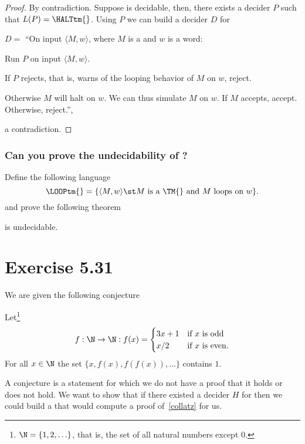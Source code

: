 \begin{proof}
By contradiction. Suppose \HALTtm{} is decidable, then,
there exists a decider \(P\) such that \(L(P) =
\text{\HALTtm{}} \). Using \(P\) we
can build a decider \(D\) for \Atm{}

\begin{TMachine}{\(D =\) ``On input \(\langle M,w \rangle\), where \(M\) is a \TM{} and \(w\) is
a word:}
	\item Run \(P\) on input \(\langle M,w \rangle\).
	\item If \(P\) rejects, that is, warns of the looping behavior of \(M\) on
		\(w\), reject.
	\item Otherwise \(M\) will halt on \(w\). We can thus simulate \(M\) on
		\(w\). If \(M\) accepts, accept. Otherwise, reject.'',
\end{TMachine}
a contradiction.
\end{proof}

\subsubsection{Can you prove the undecidability of \LOOPtm{}?}

Define the following language
\begin{displaymath}
\text{\LOOPtm{}} = \{ \langle M,w \rangle \st \text{\(M\) is a \TM{} and \(M\)
loops on \(w\)} \}.
\end{displaymath}
and prove the following theorem
\begin{theorem}\label{LOOPtm}
\LOOPtm{} is undecidable.
\end{theorem}


\section{Exercise 5.31}
We are given the following conjecture
\begin{conjecture}\label{collatz}
	Let\footnote{\(\N = \{1,2,\ldots\}\), that is, the set of all natural
		numbers except \(0\).}
\begin{displaymath}
f:\N \to \N:f(x) = \begin{cases}
	3 x + 1 & \text{if \(x\) is odd}\\
	x / 2 & \text{if \(x\) is even}.
\end{cases}
\end{displaymath}
For all \(x \in \N\) the set \(\{x,f(x),f(f(x)),\ldots\}\) contains \(1\).
\end{conjecture}
A conjecture is a statement
for which we do not have a proof that it holds or does not hold.
We want to show that if there existed a decider \(H\) for \Atm{}
then we could build a
\TM{} that would compute a proof of~\ref{collatz} for us.

